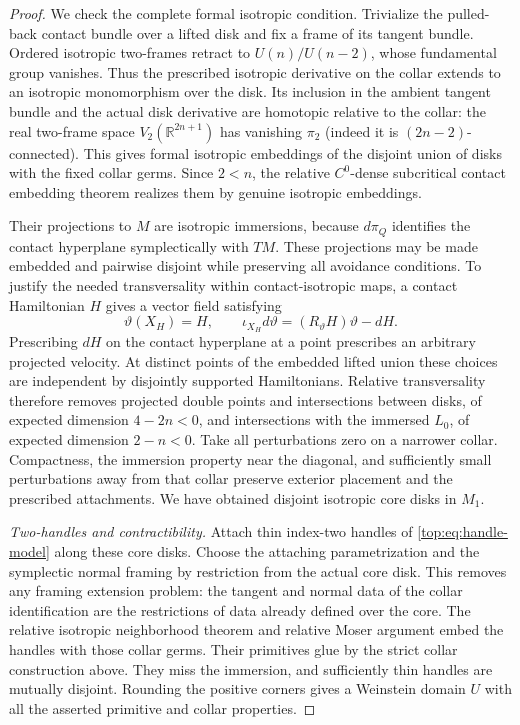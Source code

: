 \documentclass[11pt]{article}
\numberwithin{equation}{section}
\theoremstyle{definition}
\theoremstyle{remark}
\begin{document}
\begin{proof}
We check the complete formal isotropic condition.  Trivialize
the pulled-back contact bundle over a lifted disk and fix a
frame of its tangent bundle.  Ordered isotropic two-frames
retract to $U(n)/U(n-2)$, whose fundamental group vanishes.
Thus the prescribed isotropic derivative on the collar extends
to an isotropic monomorphism over the disk.  Its inclusion in
the ambient tangent bundle and the actual disk derivative are
homotopic relative to the collar: the real two-frame space
$V_2(\mathbb R^{2n+1})$ has vanishing $\pi_2$ (indeed it is
$(2n-2)$-connected).  This gives formal isotropic embeddings
of the disjoint union of disks with the fixed collar germs.
Since $2<n$, the relative $C^0$-dense subcritical contact
embedding theorem \cite[Theorem~12.4.1]{Top:EMbook} realizes
them by genuine isotropic embeddings.

Their projections to $M$ are isotropic immersions, because
$d\pi_Q$ identifies the contact hyperplane symplectically with
$TM$.  These projections may be made embedded and pairwise
disjoint while preserving all avoidance conditions.  To justify
the needed transversality within contact-isotropic maps, a
contact Hamiltonian $H$ gives a vector field satisfying
\[
 \vartheta(X_H)=H,\qquad
 \iota_{X_H}d\vartheta=(R_\vartheta H)\vartheta-dH.
\]
Prescribing $dH$ on the contact hyperplane at a point prescribes
an arbitrary projected velocity.  At distinct points of the
embedded lifted union these choices are independent by
disjointly supported Hamiltonians.  Relative transversality
therefore removes projected double points and intersections
between disks, of expected dimension $4-2n<0$, and intersections
with the immersed $L_0$, of expected dimension $2-n<0$.
Take all perturbations zero on a narrower collar.  Compactness,
the immersion property near the diagonal, and sufficiently
small perturbations away from that collar preserve exterior
placement and the prescribed attachments.  We have obtained
disjoint isotropic core disks in $M_1$.

\emph{Two-handles and contractibility.}
Attach thin index-two handles of \eqref{top:eq:handle-model}
along these core disks.  Choose the attaching parametrization
and the symplectic normal framing by restriction from the
actual core disk.  This removes any framing extension problem:
the tangent and normal data of the collar identification are
the restrictions of data already defined over the core.
The relative isotropic neighborhood theorem and relative
Moser argument embed the handles with those collar germs.
Their primitives glue by the strict collar construction above.
They miss the immersion, and sufficiently thin handles are
mutually disjoint.  Rounding the positive corners gives a
Weinstein domain $U$ with all the asserted primitive and
collar properties.


\end{proof}
\end{document}
